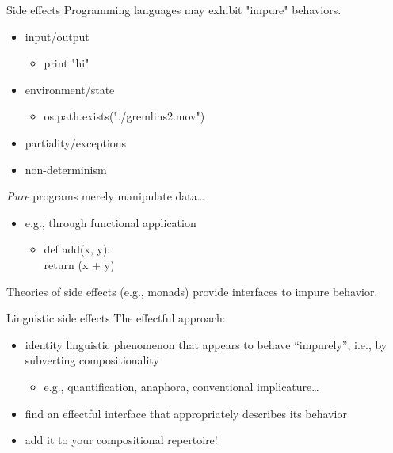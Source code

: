 \documentclass[presentation]{beamer}
\begin{document}
\begin{frame}[label={sec:org9eaeee4}]{Side effects}
Programming languages may exhibit "impure" behaviors.
\pause
\begin{itemize}[<+->]
\item input/output
\begin{itemize}
\item print "hi"
\end{itemize}
\item environment/state
\begin{itemize}
\item os.path.exists("./gremlins2.mov")
\end{itemize}
\item partiality/exceptions
\item non-determinism
\end{itemize}

\pause
\emph{Pure} programs merely manipulate data\ldots
\pause
\begin{itemize}
\item e.g., through functional application
\begin{itemize}
\item def add(x, y):\\
\hspace{5mm}return (x + y)
\end{itemize}
\end{itemize}

\bigskip

\pause
\alert{Theories of side effects (e.g., monads) provide interfaces to impure behavior.} 
\end{frame}

\begin{frame}[label={sec:orgb28ed38}]{Linguistic side effects}
The effectful approach:
\pause
\begin{itemize}[<+->]
\item identity linguistic phenomenon that appears to behave ``impurely'', i.e., by subverting compositionality
\begin{itemize}
\item e.g., quantification, anaphora, conventional implicature\ldots
\end{itemize}
\item find an effectful interface that appropriately describes its behavior
\item add it to your compositional repertoire!
\end{itemize}
\end{frame}
\end{document}
